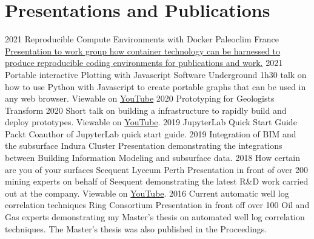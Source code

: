 \documentclass[]{friggeri-cv}
\begin{document}
\begin{entrylist}

\end{entrylist}
\newpage
\vspace*{\fill}
\section{Presentations and Publications}
\begin{entrylist}
	\entry
	{2021}
	{Reproducible Compute Environments with Docker}
	{Paleoclim France}
	{\href{https://wesleythegeolien.github.io/Presentations/docker_reproducible_envs/index.html}{Presentation to work group how container technology can be harnessed to produce reproducible coding environments for publications and work.}}
	\entry
	{2021}
	{Portable interactive Plotting with Javascript}
	{Software Underground}
	{1h30 talk on how to use Python with Javascript to create portable graphs that can be used in any web browser. Viewable on \href{https://www.youtube.com/watch?v=j\_4wkMzGvKs}{YouTube}}
	\entry
	{2020}
	{Prototyping for Geologists}
	{Transform 2020}
	{Short talk on building a infrastructure to rapidly build and deploy prototypes.
	Viewable on \href{https://youtu.be/rUbvueIF5f8?t=4130}{YouTube}.}
	\entry
	{2019}
	{JupyterLab Quick Start Guide}
	{Packt}
	{Coauthor of JupyterLab quick start guide.}
	\entry
	{2019}
	{Integration of BIM and the subsurface}
	{Indura Cluster}
	{Presentation demonstrating the integrations between Building Information Modeling and subsurface data.}
	\entry
	{2018}
	{How certain are you of your surfaces}
	{Seequent Lyceum Perth}
	{Presentation in front of over 200 mining experts on behalf of Seequent demonstrating the latest R\&D work carried out at the company. Viewable on \href{https://www.youtube.com/watch?v=jt26J5ljlA0}{YouTube}.}
	\entry
	{2016}
	{Current automatic well log correlation techniques}
	{Ring Consortium}
	{Presentation in front off over 100 Oil and Gas experts demonstrating my Master's thesis on automated well log correlation techniques. The Master's thesis was also published in the Proceedings.}
\end{entrylist}
\end{document}
